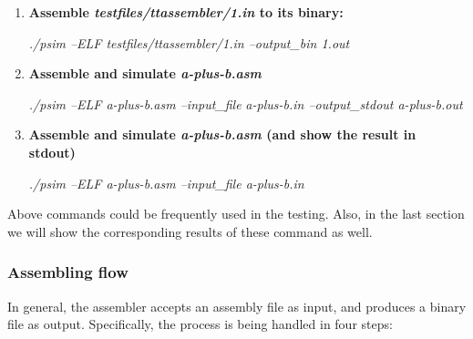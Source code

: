 \documentclass[conference, draftclsnofoot, letterpaper]{IEEETran}
\begin{document}
\begin{enumerate}[label=(\roman*)]\itemsep .5em
	\footnotesize
	\item \textbf{Assemble \emph{testfiles/ttassembler/1.in} to its binary:}
	
	\textit{\color{red}./psim --ELF testfiles/ttassembler/1.in --output\_bin 1.out}
	
	\item \textbf{Assemble and simulate \emph{a-plus-b.asm}}
	
	\textit{\color{red}./psim --ELF a-plus-b.asm --input\_file}
	\textit{\color{red}a-plus-b.in --output\_stdout a-plus-b.out}
		\item \textbf{Assemble and simulate \emph{a-plus-b.asm} (and show the result in stdout)}
		
		\textit{\color{red}./psim --ELF a-plus-b.asm --input\_file a-plus-b.in}
	\end{enumerate}
Above commands could be frequently used in the testing. Also, in the last section we will show the corresponding results of these command as well. 

\subsubsection{Assembling flow}

In general, the assembler accepts an assembly file as input, and produces a binary file as output. Specifically, the process is being handled in four steps:
\end{document}
